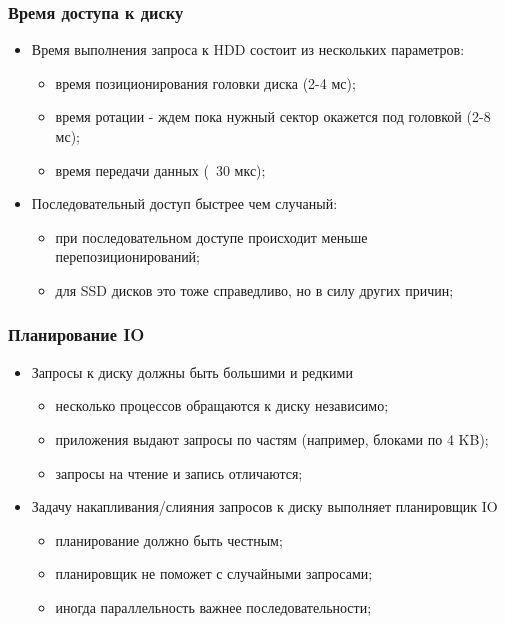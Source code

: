 \begin{frame}
\frametitle{Время доступа к диску}
\begin{itemize}
  \item<1-> Время выполнения запроса к HDD состоит из нескольких параметров:
    \begin{itemize}
      \item время позиционирования головки диска (2-4 мс);
      \item время ротации - ждем пока нужный сектор окажется под головкой (2-8 мс);
      \item время передачи данных (~30 мкс);
    \end{itemize}
  \item<2-> Последовательный доступ быстрее чем случаный:
    \begin{itemize}
      \item при последовательном доступе происходит меньше перепозиционирований;
      \item для SSD дисков это тоже справедливо, но в силу других причин;
    \end{itemize}
\end{itemize}
\end{frame}

\begin{frame}
\frametitle{Планирование IO}
\begin{itemize}
  \item<1-> Запросы к диску должны быть большими и редкими
    \begin{itemize}
      \item несколько процессов обращаются к диску независимо;
      \item приложения выдают запросы по частям (например, блоками по 4 KB);
      \item запросы на чтение и запись отличаются;
    \end{itemize}
  \item<2-> Задачу накапливания/слияния запросов к диску выполняет планировщик IO
    \begin{itemize}
      \item планирование должно быть честным;
      \item планировщик не поможет с случайными запросами;
      \item иногда параллельность важнее последовательности;
    \end{itemize}
\end{itemize}
\end{frame}
